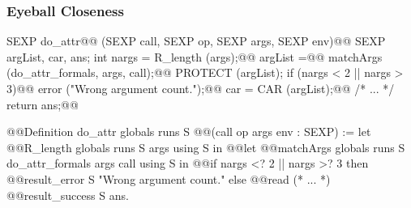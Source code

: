 \documentclass{beamer}
\begin{document}
\begin{frame}[fragile]
    \frametitle{Eyeball Closeness}

    \begin{widemargin}\centering{}
\begin{minipage}{.53\textwidth}
\begin{ccode}[fontsize=\tiny]
SEXP do_attr@@
    (SEXP call, SEXP op, SEXP args, SEXP env){@@
  SEXP argList, car, ans;
  int nargs = R_length (args);@@
  argList =@@
    matchArgs (do_attr_formals, args, call);@@
  PROTECT (argList);
  if (nargs < 2 || nargs > 3)@@
    error ("Wrong argument count.");@@
  car = CAR (argList);@@
  /* ... */
  return ans;@@
}
\end{ccode}
\end{minipage}
\qquad
\begin{minipage}{.5\textwidth}
\begin{coqcode}[fontsize=\tiny]
@@Definition do_attr globals runs S
    @@(call op args env : SEXP) :=
  let%
    @@R_length globals runs S args using S in
  @@let%
    @@matchArgs globals runs S
      do_attr_formals args call using S in
  @@if nargs <? 2 || nargs >? 3 then
    @@result_error S "Wrong argument count."
  else
    @@read%
    (* ... *)
    @@result_success S ans.
\end{coqcode}
\end{minipage}
    \end{widemargin}


\end{frame}
\end{document}
